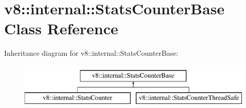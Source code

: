 \hypertarget{classv8_1_1internal_1_1StatsCounterBase}{}\section{v8\+:\+:internal\+:\+:Stats\+Counter\+Base Class Reference}
\label{classv8_1_1internal_1_1StatsCounterBase}
Inheritance diagram for v8\+:\+:internal\+:\+:Stats\+Counter\+Base\+:\begin{figure}[H]
\begin{center}
\leavevmode
\includegraphics[height=2.000000cm]{classv8_1_1internal_1_1StatsCounterBase}
\end{center}
\end{figure}
